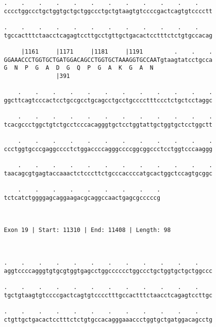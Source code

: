 \documentclass{article}
\begin{document}
\begin{Verbatim}
.    .    .    .    .    .    .    .    .    .    .    .    
cccctggccctgctggtgctgctggccctgctgtaagtgtccccgactcagtgtcccctt
                                                            
.    .    .    .    .    .    .    .    .    .    .    .    
tgccactttctaacctcagagtccttgcctgttgctgacactcctttctctgtgccacag
                                                            
     |1161     |1171     |1181     |1191         .    .    .
GGAAACCCTGGTGCTGATGGACAGCCTGGTGCTAAAGGTGCCAATgtaagtatcctgcca
G  N  P  G  A  D  G  Q  P  G  A  K  G  A  N                 
               |391                                         
  
    .    .    .    .    .    .    .    .    .    .    .    .
ggcttcagtcccactcctgccgcctgcagcctgcctgcccctttccctctgctcctaggc
                                                            
    .    .    .    .    .    .    .    .    .    .    .    .
tcacgccctggctgtctgcctcccacagggtgctcctggtattgctggtgctcctggctt
                                                            
    .    .    .    .    .    .    .    .    .    .    .    .
ccctggtgcccgaggcccctctggaccccagggccccggcggccctcctggtcccaaggg
                                                            
    .    .    .    .    .    .    .    .    .    .    .    .
taacagcgtgagtaccaaactctcccttctgcccaccccatgcactggctccagtgcggc
                                                            
    .    .    .    .    .    .    .    .    .
tctcatctggggagcaggaagacgcaggccaactgagcgcccccg
                                             
                                             
 
Exon 19 | Start: 11310 | End: 11408 | Length: 98



.    .    .    .    .    .    .    .    .    .    .    .    
aggtccccagggtgtgcgtggtgagcctggcccccctggccctgctggtgctgctggccc
                                                            
.    .    .    .    .    .    .    .    .    .    .    .    
tgctgtaagtgtccccgactcagtgtcccctttgccactttctaacctcagagtccttgc
                                                            
.    .    .    .    .    .    .    .    .    .    .    .    
ctgttgctgacactcctttctctgtgccacagggaaaccctggtgctgatggacagcctg
                                                            

\end{Verbatim}
\end{document}
